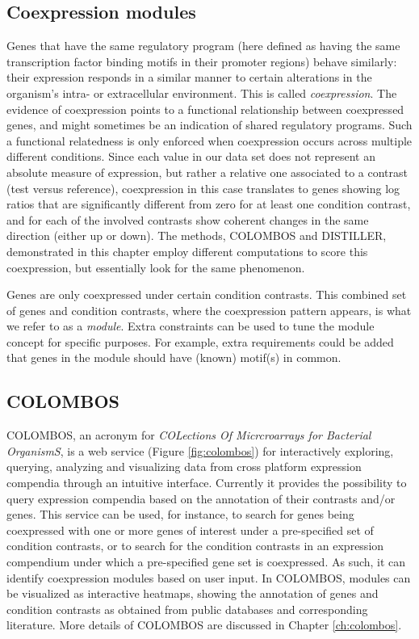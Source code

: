 \subsection{Coexpression modules}

Genes that have the same regulatory program (here defined as having the same 
transcription factor binding motifs in their promoter regions) behave 
similarly: their expression responds in a similar manner to certain alterations 
in the organism's intra- or extracellular environment. This is called 
\textit{coexpression}. The evidence of coexpression points to a functional 
relationship between coexpressed genes, and might sometimes be an indication of 
shared regulatory programs. 
%
Such a functional relatedness is only enforced when coexpression occurs across
multiple different conditions. Since each value in our data set does not
represent an absolute measure of expression, but rather a relative one
associated to a contrast (test versus reference), coexpression in this case
translates to genes showing log ratios that are significantly different from
zero for at least one condition contrast, and for each of the involved contrasts
show coherent changes in the same direction (either up or down).
%
The methods, COLOMBOS and DISTILLER, demonstrated in this chapter employ
different computations to score this coexpression, but essentially look for the
same phenomenon.

Genes are only coexpressed under certain condition contrasts. This combined set
of genes and condition contrasts, where the coexpression pattern appears, is
what we refer to as a \textit{module}. Extra constraints can be used to tune the
module concept for specific purposes. For example, extra requirements could be
added that genes in the module should have (known) motif(s) in common.


\subsection{COLOMBOS}

COLOMBOS, an acronym for \textit{COLections Of Micrcroarrays for Bacterial
  OrganismS}, is a web service \cite{COLOMBOS, Meysman2014}
(Figure \ref{fig:colombos}) for interactively exploring, querying, analyzing and
visualizing data from cross platform expression compendia through an intuitive
interface.
%
Currently it provides the possibility to query expression compendia based on the
annotation of their contrasts and/or genes.
%
This service can be used, for instance, to search for genes being coexpressed
with one or more genes of interest under a pre-specified set of condition
contrasts, or to search for the condition contrasts in an expression compendium
under which a pre-specified gene set is coexpressed. As such, it can identify
coexpression modules based on user input.
%
In COLOMBOS, modules can be visualized as interactive heatmaps, showing the
annotation of genes and condition contrasts as obtained from public databases
and corresponding literature. More details of COLOMBOS are discussed in Chapter
\ref{ch:colombos}.

